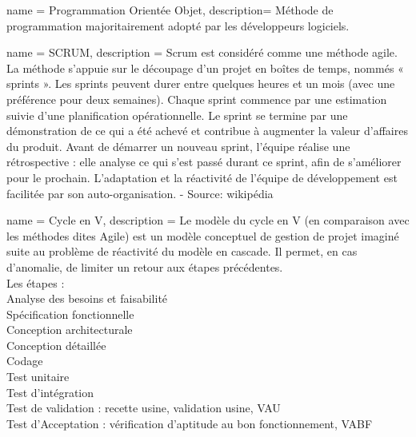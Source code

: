 
                 {
                   name = {Programmation Orientée Objet},
                   description= {Méthode de programmation majoritairement adopté par les développeurs logiciels.}
                 }

{
name = {SCRUM},
description = {Scrum est considéré comme une méthode agile.\\ La méthode s'appuie sur le découpage d'un projet en boîtes de temps, nommés « sprints ». Les sprints peuvent durer entre quelques heures et un mois (avec une préférence pour deux semaines). Chaque sprint commence par une estimation suivie d'une planification opérationnelle. Le sprint se termine par une démonstration de ce qui a été achevé et contribue à augmenter la valeur d'affaires du produit. Avant de démarrer un nouveau sprint, l'équipe réalise une rétrospective : elle analyse ce qui s'est passé durant ce sprint, afin de s'améliorer pour le prochain. L'adaptation et la réactivité de l'équipe de développement est facilitée par son auto-organisation. - Source: wikipédia }
}

{
name = {Cycle en V},
description = {
Le modèle du cycle en V (en comparaison avec les méthodes dites Agile) est un modèle conceptuel de gestion de projet imaginé suite au problème de réactivité du modèle en cascade. Il permet, en cas d'anomalie, de limiter un retour aux étapes précédentes. \\
Les étapes : \\
    Analyse des besoins et faisabilité \\
    Spécification fonctionnelle \\
    Conception architecturale\\
    Conception détaillée\\
    Codage\\
    Test unitaire \\
    Test d'intégration\\
    Test de validation : recette usine, validation usine, VAU\\
    Test d'Acceptation : vérification d'aptitude au bon fonctionnement, VABF\\}
}
